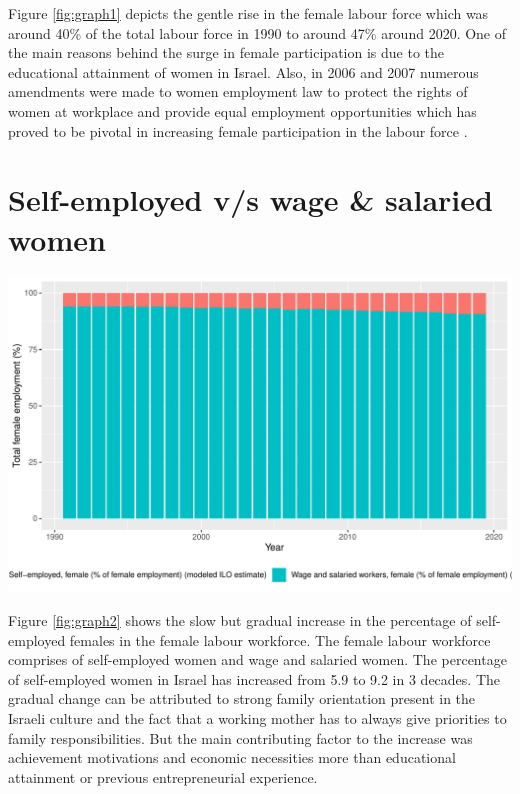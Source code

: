 \documentclass[11pt,a4paper,]{article}
\let\origfigure\figure
\let\endorigfigure\endfigure
\renewenvironment{figure}[1][2] {
    \expandafter\origfigure\expandafter[H]
} {
    \endorigfigure
}%
\begin{document}
Figure \ref{fig:graph1} depicts the gentle rise in the female labour force which was around 40\% of the total labour force in 1990 to around 47\% around 2020. One of the main reasons behind the surge in female participation is due to the educational attainment of women in Israel. Also, in 2006 and 2007 numerous amendments were made to women employment law to protect the rights of women at workplace and provide equal employment opportunities which has proved to be pivotal in increasing female participation in the labour force \autocite{israelministryofforeignaffairs2013}.

\hypertarget{self-employed-vs-wage-salaried-women}{%
\section{Self-employed v/s wage \& salaried women}\label{self-employed-vs-wage-salaried-women}}

\begin{figure}
\centering
\includegraphics{report_files/figure-latex/graph2-1.pdf}
\caption{\label{fig:graph2}Self-employed v/s Wage \& salaried female workers}
\end{figure}

Figure \ref{fig:graph2} shows the slow but gradual increase in the percentage of self-employed females in the female labour workforce. The female labour workforce comprises of self-employed women and wage and salaried women. The percentage of self-employed women in Israel has increased from 5.9 to 9.2 in 3 decades. The gradual change can be attributed to strong family orientation present in the Israeli culture and the fact that a working mother has to always give priorities to family responsibilities. But the main contributing factor to the increase was achievement motivations and economic necessities more than educational attainment or previous entrepreneurial experience. \textcite{lerner1997israeli}
\end{document}
